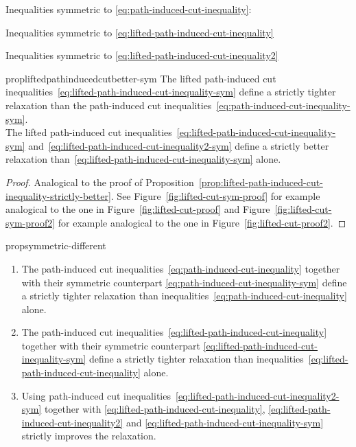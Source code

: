 \documentclass{article}
\begin{document}
Inequalities symmetric to \eqref{eq:path-induced-cut-inequality}:


Inequalities symmetric to \eqref{eq:lifted-path-induced-cut-inequality}


Inequalities symmetric to \eqref{eq:lifted-path-induced-cut-inequality2}




\begin{restatable}{prop}{liftedpathinducedcutbetter-sym}
\label{prop:lifted-path-induced-cut-inequality-strictly-better-sym}
    The lifted path-induced cut inequalities~\eqref{eq:lifted-path-induced-cut-inequality-sym} define a strictly tighter relaxation than the path-induced cut inequalities~\eqref{eq:path-induced-cut-inequality-sym}.\\
    The lifted path-induced cut inequalities~\eqref{eq:lifted-path-induced-cut-inequality-sym} and~\eqref{eq:lifted-path-induced-cut-inequality2-sym} define a strictly better relaxation than~\eqref{eq:lifted-path-induced-cut-inequality-sym} alone.
\end{restatable}

\begin{proof}
Analogical to the proof of Proposition~\ref{prop:lifted-path-induced-cut-inequality-strictly-better}. See Figure~\ref{fig:lifted-cut-sym-proof} for example analogical to the one in Figure~\ref{fig:lifted-cut-proof} and Figure~\ref{fig:lifted-cut-sym-proof2} for example analogical to the one in Figure~\ref{fig:lifted-cut-proof2}.
\end{proof}




\begin{restatable}{prop}{symmetric-different}
\label{prop:sym-different}

\begin{enumerate}
    \item The path-induced cut inequalities~\eqref{eq:path-induced-cut-inequality} together with their symmetric counterpart \eqref{eq:path-induced-cut-inequality-sym} define a strictly tighter relaxation than  inequalities~\eqref{eq:path-induced-cut-inequality} alone.
    \item The path-induced cut inequalities~\eqref{eq:lifted-path-induced-cut-inequality} together with their symmetric counterpart \eqref{eq:lifted-path-induced-cut-inequality-sym} define a strictly tighter relaxation than  inequalities~\eqref{eq:lifted-path-induced-cut-inequality} alone.
       \item Using path-induced cut inequalities~\eqref{eq:lifted-path-induced-cut-inequality2-sym} together with \eqref{eq:lifted-path-induced-cut-inequality}, \eqref{eq:lifted-path-induced-cut-inequality2} and \eqref{eq:lifted-path-induced-cut-inequality-sym} strictly improves the relaxation.
\end{enumerate}    
\end{restatable}
\end{document}
